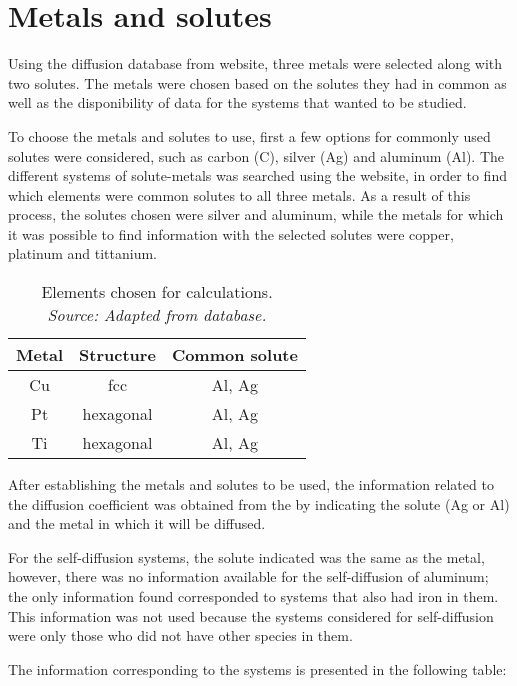 \section{Metals and solutes}

Using the diffusion database from \citet{kakusan} website, three metals were selected along with two solutes. The metals were chosen based on the solutes they had in common as well as the disponibility of data for the systems that wanted to be studied.

To choose the metals and solutes to use, first a few options for commonly used solutes were considered, such as carbon (C), silver (Ag) and aluminum (Al). The different systems of solute-metals was searched using the \cite{kakusan} website, in order to find which elements were common solutes to all three metals. As a result of this process, the solutes chosen were silver and aluminum, while the metals for which it was possible to find information with the selected solutes were copper, platinum and tittanium.

\begin{table}[H]
    \centering
    \captionsetup{justification=centering}
    \begin{tabular}{ccc}
        Metal & Structure & Common solute\\ \hline \hline
        Cu & fcc & Al, Ag \\
        Pt & hexagonal & Al, Ag \\
        Ti & hexagonal & Al, Ag \\
    \end{tabular}
    \caption{Elements chosen for calculations. \\ 
    \textit{Source: Adapted from \citep{kakusan} database.}}
    \label{tab:tabla1}
\end{table}

After establishing the metals and solutes to be used, the information related to the diffusion coefficient was obtained from the \citet{kakusan} by indicating the solute (Ag or Al) and the metal in which it will be diffused.

For the self-diffusion systems, the solute indicated was the same as the metal, however, there was no information available for the self-diffusion of aluminum; the only information found corresponded to systems that also had iron in them. This information was not used because the systems considered for self-diffusion were only those who did not have other species in them.

\newpage
The information corresponding to the systems is presented in the following table:

